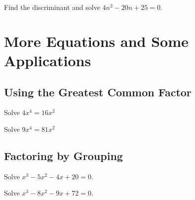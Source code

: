 \newpage

\begin{exercise}
Find the discriminant and solve $4n^2-20n+25=0$.
\end{exercise}
\begin{solution}[3in]

\end{solution}
\vspace{0.5em}

\section{More Equations and Some Applications}
\subsection{Using the Greatest Common Factor}

\begin{exercise}
Solve $4x^4=16x^2$
\end{exercise}
\begin{solution}[2in]

\end{solution}
\vspace{0.5em}

\begin{exercise}
Solve $9x^4=81x^2$
\end{exercise}
\begin{solution}[1.5in]

\end{solution}
\vspace{0.5em}

\subsection{Factoring by Grouping}
\begin{exercise}
Solve $x^3-5x^2-4x+20=0$.
\end{exercise}
\begin{solution}[2.2in]

\end{solution}
\vspace{0.5em}

\begin{exercise}
Solve $x^3-8x^2-9x+72=0$.
\end{exercise}
\begin{solution}[2.2in]

\end{solution}
\vspace{0.5em}

